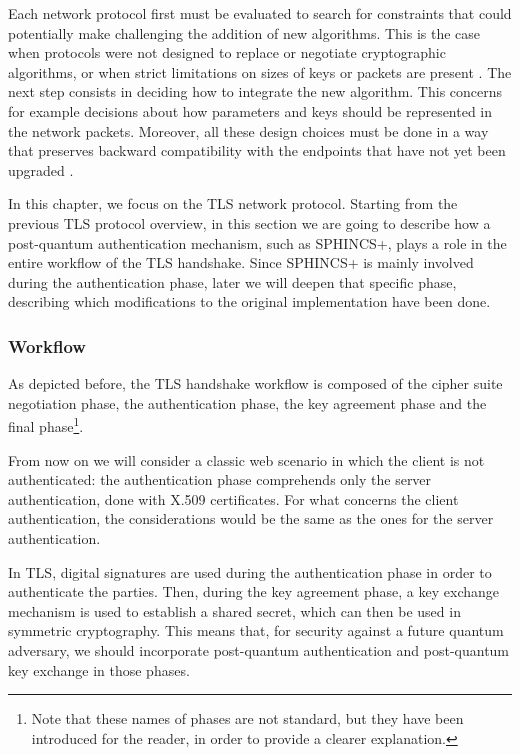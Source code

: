 \documentclass[a4paper,12pt]{article}
\begin{document}
Each network protocol first must be evaluated to search for constraints that could potentially make challenging the addition of new algorithms. This is the case when protocols were not designed to replace or negotiate cryptographic algorithms, or when strict limitations on sizes of keys or packets are present \cite{6_NISTPQC_TLS_SSH}.
The next step consists in deciding how to integrate the new algorithm. This concerns for example decisions about how parameters and keys should be represented in the network packets.
Moreover, all these design choices must be done in a way that preserves backward compatibility with the endpoints that have not yet been upgraded \cite{6_NISTPQC_TLS_SSH}.

In this chapter, we focus on the TLS network protocol. 
Starting from the previous TLS protocol overview, in this section we are going to describe how a post-quantum authentication mechanism, such as SPHINCS+, plays a role in the entire workflow of the TLS handshake.
Since SPHINCS+ is mainly involved during the authentication phase, later we will deepen that specific phase, describing which modifications to the original implementation have been done.

\subsubsection{Workflow}

As depicted before, the TLS handshake workflow is composed of the cipher suite negotiation phase, the authentication phase, the key agreement phase and the final phase\footnote{Note that these names of phases are not standard, but they have been introduced for the reader, in order to provide a clearer explanation.}.

From now on we will consider a classic web scenario in which the client is not authenticated: the authentication phase comprehends only the server authentication, done with X.509 certificates. For what concerns the client authentication, the considerations would be the same as the ones for the server authentication.

In TLS, digital signatures are used during the authentication phase in order to authenticate the parties. Then, during the key agreement phase, a key exchange mechanism is used to establish a shared secret, which can then be used in symmetric cryptography.
This means that, for security against a future quantum adversary, we should incorporate post-quantum authentication and post-quantum key exchange in those phases.
\end{document}

